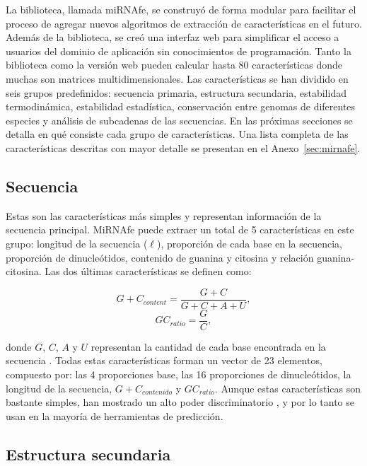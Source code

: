 La biblioteca, llamada miRNAfe, se construyó de forma modular para facilitar el proceso de agregar nuevos algoritmos de extracción de características en el
futuro. Además de la biblioteca, se creó una interfaz web para simplificar el acceso a usuarios del dominio de aplicación sin conocimientos de programación.
Tanto la biblioteca como la versión web pueden calcular hasta 80 características donde muchas son matrices multidimensionales. Las características se han
dividido en seis grupos predefinidos: secuencia primaria, estructura secundaria, estabilidad termodinámica, estabilidad estadística, conservación entre genomas
de diferentes especies y análisis de subcadenas de las secuencias. En las próximas secciones se detalla en qué consiste cada grupo de características. Una lista
completa de las características descritas con mayor detalle se presentan en el Anexo~\ref{sec:mirnafe}.


\subsection{Secuencia}

Estas son las características más simples y representan información de la secuencia principal. MiRNAfe puede extraer un total de 5 características en este
grupo: longitud de la secuencia ($\ell$), proporción de cada base en la secuencia, proporción de dinucleótidos, contenido de guanina y citosina y relación
guanina-citosina. Las dos últimas características se definen como:

\begin{equation} \label{eq:contenidoGC}
	{G+C}_{content} = \frac{G+C}{G+C+A+U},
\end{equation}
\begin{equation} \label{eq:GCratio}
	{GC}_{ratio} = \frac{G}{C},
\end{equation}

\noindent donde $G$, $C$, $A$ y $U$ representan la cantidad de cada base encontrada en la secuencia \citep{hertel2006hairpins}. Todas estas características forman un
vector de 23 elementos, compuesto por: las 4 proporciones base, las 16 proporciones de dinucleótidos, la longitud de la secuencia, ${G+C}_{contenido}$ y
${GC}_{ratio}$. Aunque estas características son bastante simples, han mostrado un alto poder discriminatorio \citep{batuwita2009micropred}, y por lo tanto se usan en la
mayoría de herramientas de predicción.

\subsection{Estructura secundaria}

